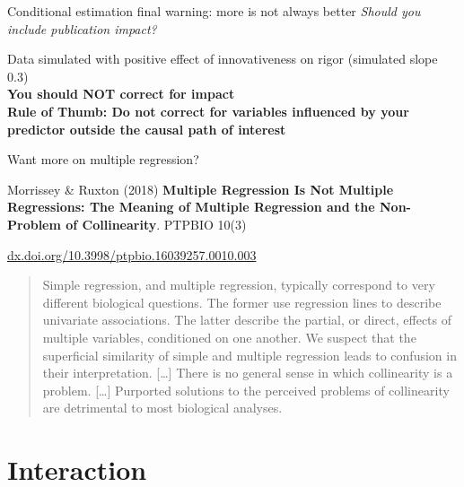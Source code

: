\documentclass[10pt]{beamer}\usepackage[]{graphicx}\usepackage[]{color}
\begin{document}
\begin{frame}[fragile]{Conditional estimation final warning: more is not always better}
    \textit{Should you include publication impact?}

  \pause
  Data simulated with positive effect of innovativeness on rigor (simulated slope 0.3)\\ \pause
  \textbf{You should NOT correct for impact}\\ \bigskip \pause
  \textbf{\large \color{red} Rule of Thumb: Do not correct for variables influenced by your predictor outside the causal path of interest}
\end{frame}



\begin{frame}{Want more on multiple regression?}

Morrissey \& Ruxton (2018) \textbf{Multiple Regression Is Not Multiple Regressions: The Meaning of Multiple Regression and the Non-Problem of Collinearity}. PTPBIO 10(3)

{\color{blue} \href{dx.doi.org/10.3998/ptpbio.16039257.0010.003}{dx.doi.org/10.3998/ptpbio.16039257.0010.003}}
 
 \begin{quote}
 Simple regression, and multiple regression, typically correspond to very different biological questions. The former use regression lines to describe univariate associations. The latter describe the partial, or direct, effects of multiple variables, conditioned on one another. We suspect that the superficial similarity of simple and multiple regression leads to confusion in their interpretation. [\dots] There is no general sense in which collinearity is a problem. [\dots] Purported solutions to the perceived problems of collinearity are detrimental to most biological analyses.
 \end{quote}
\end{frame}

\section{Interaction}
\end{document}
